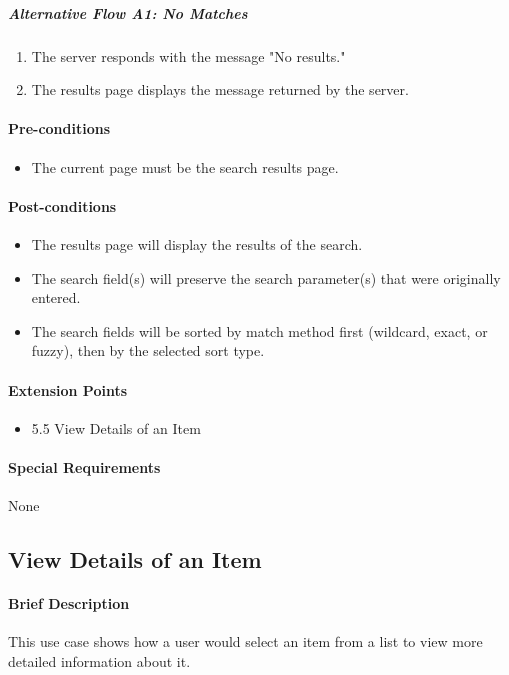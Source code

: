 \documentclass{article}
\begin{document}
\subparagraph{Alternative Flow A1: No Matches}
\begin{enumerate}
\item The server responds with the message "No results."
\item The results page displays the message returned by the server.
\end{enumerate}

\paragraph{Pre-conditions}
\begin{itemize}
\item The current page must be the search results page.
\end{itemize}

\paragraph{Post-conditions}
\begin{itemize}
\item The results page will display the results of the search.
\item The search field(s) will preserve the search parameter(s) that were originally entered.
\item The search fields will be sorted by match method first (wildcard, exact, or fuzzy), then by the selected sort type.
\end{itemize}

\paragraph{Extension Points}
\begin{itemize}
\item 5.5 View Details of an Item
\end{itemize}

\paragraph{Special Requirements}
None


\subsection{View Details of an Item}
\paragraph{Brief Description}
This use case shows how a user would select an item from a list to view more detailed information about it.
\end{document}
